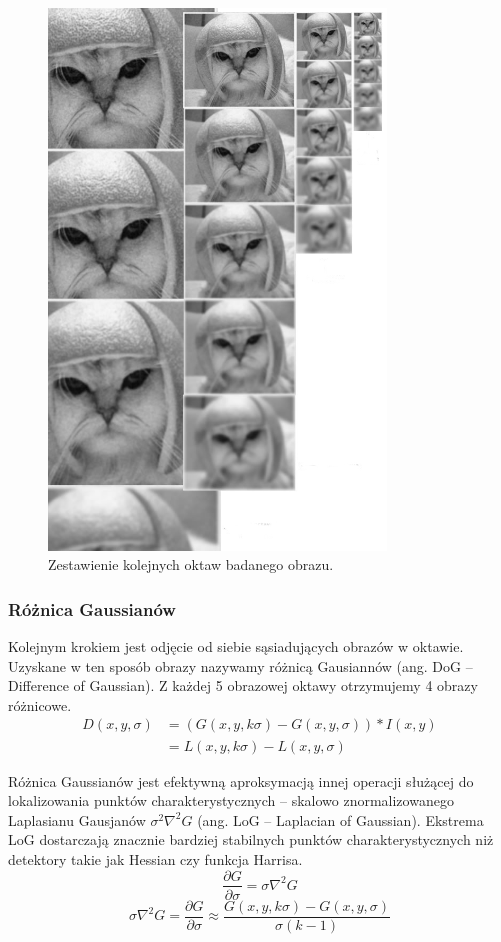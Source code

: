 \begin{figure}[!htb]
\centering
\includegraphics[width=0.8\textwidth]{pict/02/sift/sift_ais_octave.jpg}
\caption{Zestawienie kolejnych oktaw badanego obrazu.}
\label{fig:sift_ais_octave}
\end{figure}

\subsubsection{Różnica Gaussianów}
Kolejnym krokiem jest odjęcie od siebie sąsiadujących obrazów w oktawie. Uzyskane w ten sposób obrazy nazywamy różnicą Gausiannów (ang. DoG – Difference  of Gaussian). Z każdej 5 obrazowej oktawy otrzymujemy 4 obrazy różnicowe.
\begin{align}
D(x,y,\sigma) &= (G(x,y,k\sigma)-G(x,y,\sigma))*I(x,y)\\
&= L(x,y,k\sigma) - L(x,y,\sigma)
\end{align}

Różnica Gaussianów jest efektywną aproksymacją innej operacji służącej do lokalizowania punktów charakterystycznych – skalowo znormalizowanego Laplasianu Gausjanów $\sigma^2\nabla^2G$ (ang. LoG – Laplacian of Gaussian). Ekstrema LoG dostarczają znacznie bardziej stabilnych punktów charakterystycznych niż detektory takie jak Hessian czy funkcja Harrisa.
\begin{equation}
\frac{\partial G}{\partial \sigma}  = \sigma {\nabla}^2 G
\end{equation}
\begin{equation}
\sigma {\nabla}^2 G = \frac{\partial G}{\partial \sigma} \approx \frac{G(x,y,k\sigma)-G(x,y,\sigma)}{\sigma(k-1)}
\end{equation}

